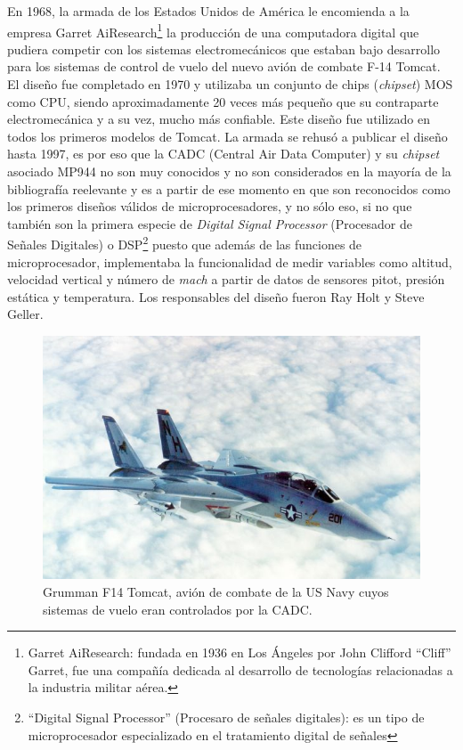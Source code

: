 En 1968, la armada de los Estados Unidos de América le encomienda a la empresa
Garret AiResearch\footnote{Garret AiResearch: fundada en 1936 en Los Ángeles por
John Clifford ``Cliff'' Garret, fue una compañía dedicada  al desarrollo de
tecnologías relacionadas a la industria militar aérea.} la producción de una
computadora digital que pudiera competir con los sistemas electromecánicos que
estaban bajo desarrollo para los sistemas de control de vuelo del nuevo avión de
combate F-14 Tomcat. El diseño fue completado en 1970 y utilizaba un conjunto de
chips (\emph{chipset}) MOS como CPU, siendo aproximadamente 20 veces más pequeño
que su contraparte electromecánica y a su vez, mucho más confiable. Este diseño
fue utilizado en todos los primeros modelos de Tomcat. La armada se rehusó a
publicar el diseño hasta 1997, es por eso que la CADC (Central Air Data
Computer) y su \emph{chipset} asociado MP944 no son muy conocidos y no son
considerados en la mayoría de la bibliografía reelevante y es a partir de ese
momento en que son reconocidos como los primeros diseños válidos de
microprocesadores, y no sólo eso, si no que también son la primera especie de
\emph{Digital Signal Processor} (Procesador de Señales Digitales) o
DSP\footnote{``Digital Signal Processor'' (Procesaro de señales digitales): es
un tipo de microprocesador especializado en el tratamiento digital de señales}
puesto que además de las funciones de microprocesador, implementaba la
funcionalidad de medir variables como altitud, velocidad vertical y número de
\emph{mach} a partir de datos de sensores pitot, presión estática y temperatura.
Los responsables del diseño fueron Ray Holt y Steve Geller.

\begin{figure}
  \centering
  \includegraphics[scale=0.5]{./figures/C02-f14_tomcat}
  \captionsetup{justification=centering}
  \caption{Grumman F14 Tomcat, avión de combate de la US Navy cuyos sistemas de 
    vuelo eran controlados por la CADC.}
  \label{fig:C02-f14_tomcat}
\end{figure}


